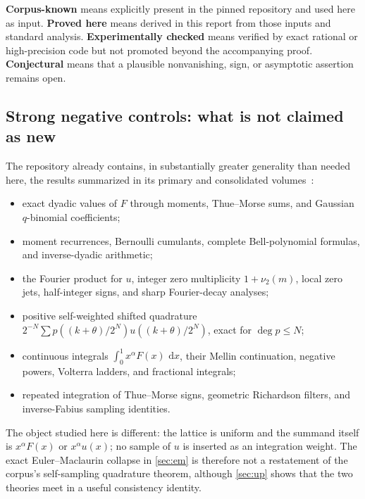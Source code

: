 \documentclass[11pt,oneside]{article}
\numberwithin{equation}{section}
\theoremstyle{definition}
\theoremstyle{remark}
\newcommand{\dd}{\,\mathrm d}
\begin{document}
\begin{statusbox}
\textbf{Corpus-known} means explicitly present in the pinned repository and used here as
input.  \textbf{Proved here} means derived in this report from those inputs and standard
analysis.  \textbf{Experimentally checked} means verified by exact rational or
high-precision code but not promoted beyond the accompanying proof.  \textbf{Conjectural}
means that a plausible nonvanishing, sign, or asymptotic assertion remains open.
\end{statusbox}

\subsection{Strong negative controls: what is not claimed as new}

The repository already contains, in substantially greater generality than needed here,
the results summarized in its primary and consolidated volumes~\cite{ProveItPrimary,ProveItSampling,ProveItIntegration,ProveItRepresentations}:
\begin{itemize}
\item exact dyadic values of \(F\) through moments, Thue--Morse sums, and Gaussian
      \(q\)-binomial coefficients;
\item moment recurrences, Bernoulli cumulants, complete Bell-polynomial formulas, and
      inverse-dyadic arithmetic;
\item the Fourier product for \(u\), integer zero multiplicity \(1+\nu_2(m)\), local
      zero jets, half-integer signs, and sharp Fourier-decay analyses;
\item positive self-weighted shifted quadrature
      \(2^{-N}\sum p((k+\theta)/2^N)u((k+\theta)/2^N)\), exact for
      \(\deg p\le N\);
\item continuous integrals \(\int_0^1x^\alpha F(x)\,\dd x\), their Mellin continuation,
      negative powers, Volterra ladders, and fractional integrals;
\item repeated integration of Thue--Morse signs, geometric Richardson filters, and
      inverse-Fabius sampling identities.
\end{itemize}

The object studied here is different: the lattice is uniform and the summand itself is
\(x^\alpha F(x)\) or \(x^\alpha u(x)\); no sample of \(u\) is inserted as an
integration weight.  The exact Euler--Maclaurin collapse in \cref{sec:em} is therefore
not a restatement of the corpus's self-sampling quadrature theorem, although
\cref{sec:up} shows that the two theories meet in a useful consistency identity.
\end{document}
